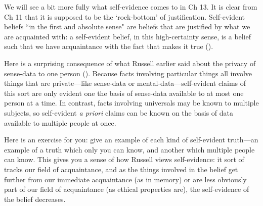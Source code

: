 \documentclass[oneside,letterpaper,12pt]{book}
\begin{document}
We will see a bit more fully what self-evidence comes to in Ch 13. It is clear from Ch 11 that it is supposed to be the `rock-bottom' of justification. Self-evident beliefs ``in the first and absolute sense" are beliefs that are justified by what we are acquainted with: a self-evident belief, in this high-certainty sense, is a belief such that we have acquaintance with the fact that makes it true (\pageref{selfevident}).

Here is a surprising consequence of what Russell earlier said about the privacy of sense-data to one person (\pageref{private}). Because facts involving particular things all involve things that are private---like sense-data or mental-data---self-evident claims of this sort are only evident one the basis of sense-data available to at most one person at a time. In contrast, facts involving universals may be known to multiple subjects, so self-evident \emph{a priori} claims can be known on the basis of data available to multiple people at once.

Here is an exercise for you: give an example of each kind of self-evident truth---an example of a truth which only you can know, and another which multiple people can know. This gives you a sense of how Russell views self-evidence: it sort of tracks our field of acquaintance, and as the things involved in the belief get further from our immediate acquaintance (as in memory) or are less obviously part of our field of acquaintance (as ethical properties are), the self-evidence of the belief decreases.
\end{document}
